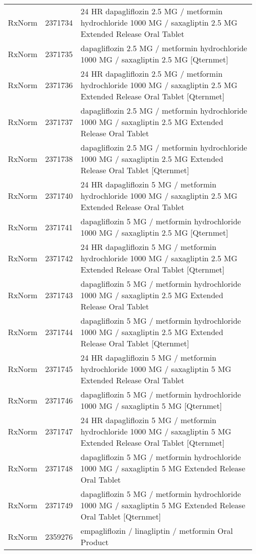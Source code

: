 \begin{longtable}{p{}p{}p{}}
  RxNorm & 2371734 & 24 HR dapagliflozin 2.5 MG / metformin hydrochloride 1000 MG / saxagliptin 2.5 MG Extended Release Oral Tablet \\ 
  RxNorm & 2371735 & dapagliflozin 2.5 MG / metformin hydrochloride 1000 MG / saxagliptin 2.5 MG [Qternmet] \\ 
  RxNorm & 2371736 & 24 HR dapagliflozin 2.5 MG / metformin hydrochloride 1000 MG / saxagliptin 2.5 MG Extended Release Oral Tablet [Qternmet] \\ 
  RxNorm & 2371737 & dapagliflozin 2.5 MG / metformin hydrochloride 1000 MG / saxagliptin 2.5 MG Extended Release Oral Tablet \\ 
  RxNorm & 2371738 & dapagliflozin 2.5 MG / metformin hydrochloride 1000 MG / saxagliptin 2.5 MG Extended Release Oral Tablet [Qternmet] \\ 
  RxNorm & 2371740 & 24 HR dapagliflozin 5 MG / metformin hydrochloride 1000 MG / saxagliptin 2.5 MG Extended Release Oral Tablet \\ 
  RxNorm & 2371741 & dapagliflozin 5 MG / metformin hydrochloride 1000 MG / saxagliptin 2.5 MG [Qternmet] \\ 
  RxNorm & 2371742 & 24 HR dapagliflozin 5 MG / metformin hydrochloride 1000 MG / saxagliptin 2.5 MG Extended Release Oral Tablet [Qternmet] \\ 
  RxNorm & 2371743 & dapagliflozin 5 MG / metformin hydrochloride 1000 MG / saxagliptin 2.5 MG Extended Release Oral Tablet \\ 
  RxNorm & 2371744 & dapagliflozin 5 MG / metformin hydrochloride 1000 MG / saxagliptin 2.5 MG Extended Release Oral Tablet [Qternmet] \\ 
  RxNorm & 2371745 & 24 HR dapagliflozin 5 MG / metformin hydrochloride 1000 MG / saxagliptin 5 MG Extended Release Oral Tablet \\ 
  RxNorm & 2371746 & dapagliflozin 5 MG / metformin hydrochloride 1000 MG / saxagliptin 5 MG [Qternmet] \\ 
  RxNorm & 2371747 & 24 HR dapagliflozin 5 MG / metformin hydrochloride 1000 MG / saxagliptin 5 MG Extended Release Oral Tablet [Qternmet] \\ 
  RxNorm & 2371748 & dapagliflozin 5 MG / metformin hydrochloride 1000 MG / saxagliptin 5 MG Extended Release Oral Tablet \\ 
  RxNorm & 2371749 & dapagliflozin 5 MG / metformin hydrochloride 1000 MG / saxagliptin 5 MG Extended Release Oral Tablet [Qternmet] \\ 
  RxNorm & 2359276 & empagliflozin / linagliptin / metformin Oral Product \\ 

\end{longtable}
